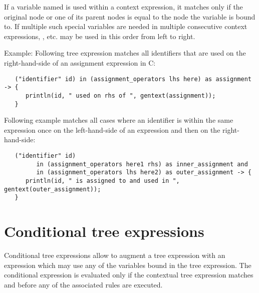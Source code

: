 \noindent
If a variable named  is used within a context expression,
it matches only if the original node or one of its parent nodes is equal
to the node the variable  is bound to. If multiple such
special variables are needed in multiple consecutive context expressions,
,  etc. may be used in this order from left
to right.

Example: Following tree expression matches all identifiers that are
used on the right-hand-side of an assignment expression in C:

\begin{lstlisting}
   ("identifier" id) in (assignment_operators lhs here) as assignment -> {
      println(id, " used on rhs of ", gentext(assignment));
   }
\end{lstlisting}

\noindent
Following example matches all cases where an identifier is within
the same expression once on the left-hand-side of an expression and
then on the right-hand-side:

\begin{lstlisting}
   ("identifier" id)
         in (assignment_operators here1 rhs) as inner_assignment and
         in (assignment_operators lhs here2) as outer_assignment -> {
      println(id, " is assigned to and used in ", gentext(outer_assignment));
   }
\end{lstlisting}

\section{Conditional tree expressions}

Conditional tree expressions allow to augment a tree expression with
an expression which may use any of the variables bound in the tree
expression. The conditional expression is evaluated only if the
contextual tree expression matches and before any of the associated
rules are executed.

\begin{grammar}
      \produces {} \\
      \produces {}
	  
\end{grammar}

\endinput
